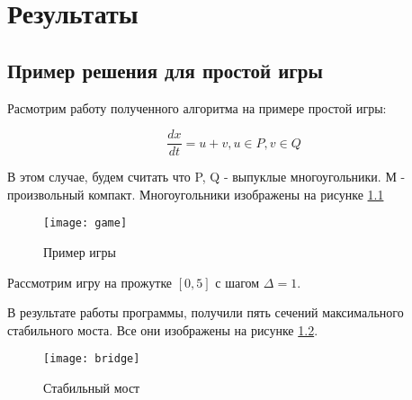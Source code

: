 \chapter{Результаты}

\section{Пример решения для простой игры}

Расмотрим работу полученного алгоритма на примере простой игры:

\begin{equation}
    \frac{dx}{dt} = u + v, u \in P, v \in Q
\end{equation}

В этом случае, будем считать что P, Q - выпуклые многоугольники.
М - произвольный компакт. 
Многоугольники изображены на рисунке \ref{fig:game} 

\begin{figure}
    \centering
    \texttt{[image: game]}
    \caption{Пример игры}
    \label{fig:game}
\end{figure}

Рассмотрим игру на прожутке $[0, 5]$ с шагом $\Delta = 1$.

В результате работы программы, 
получили пять сечений максимального стабильного моста.
Все они изображены на рисунке \ref{fig:bridge}.

\begin{figure}
    \centering
    \texttt{[image: bridge]}
    \caption{Стабильный мост}
    \label{fig:bridge}
\end{figure}